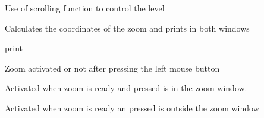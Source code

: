 \documentclass[letterpaper,10pt,openany,oneside]{sphinxmanual}
\begin{document}
\begin{fulllineitems}
\begin{fulllineitems}
\end{fulllineitems}


\begin{fulllineitems}
\label{rst/visu2d:Visu.zooming.ZOOMING.on_scroll}
Use of scrolling function to control the level

\end{fulllineitems}


\begin{fulllineitems}
\label{rst/visu2d:Visu.zooming.ZOOMING.plot_zooms}
Calculates the coordinates of the zoom and prints in both windows

\end{fulllineitems}


\begin{fulllineitems}
\label{rst/visu2d:Visu.zooming.ZOOMING.pr}
print

\end{fulllineitems}


\begin{fulllineitems}
\label{rst/visu2d:Visu.zooming.ZOOMING.press_zoom}
Zoom activated or not after pressing the left mouse button

\end{fulllineitems}


\begin{fulllineitems}
\label{rst/visu2d:Visu.zooming.ZOOMING.press_zoomready_and_in}
Activated when zoom is ready and pressed is in the zoom window.

\end{fulllineitems}


\begin{fulllineitems}
\label{rst/visu2d:Visu.zooming.ZOOMING.press_zoomready_and_out}
Activated when zoom is ready an pressed is outside the zoom window


\end{fulllineitems}
\end{fulllineitems}
\end{document}
